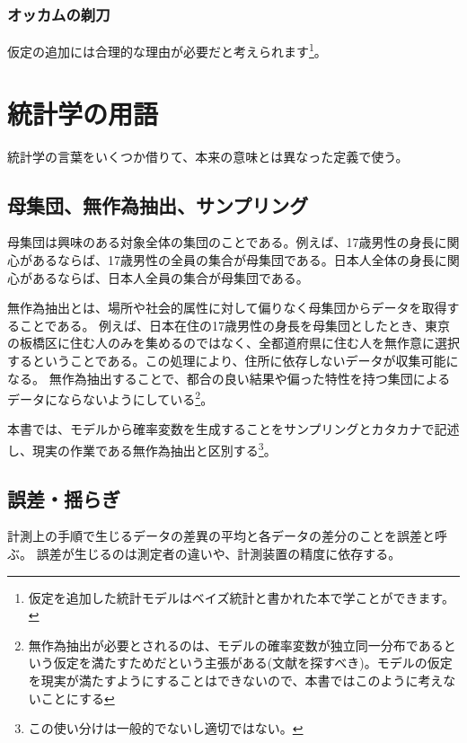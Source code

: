 \subsubsection{オッカムの剃刀}

仮定の追加には合理的な理由が必要だと考えられます\footnote{仮定を追加した統計モデルはベイズ統計と書かれた本で学ことができます。}。

\begin{figure}
    \begin{center}
%
\end{center}
\end{figure}
\fi


\section{統計学の用語}
統計学の言葉をいくつか借りて、本来の意味とは異なった定義で使う。


\subsection{母集団、無作為抽出、サンプリング}
母集団は興味のある対象全体の集団のことである。例えば、17歳男性の身長に関心があるならば、17歳男性の全員の集合が母集団である。日本人全体の身長に関心があるならば、日本人全員の集合が母集団である。

無作為抽出とは、場所や社会的属性に対して偏りなく母集団からデータを取得することである。
例えば、日本在住の17歳男性の身長を母集団としたとき、東京の板橋区に住む人のみを集めるのではなく、全都道府県に住む人を無作意に選択するということである。この処理により、住所に依存しないデータが収集可能になる。
無作為抽出することで、都合の良い結果や偏った特性を持つ集団によるデータにならないようにしている\footnote{無作為抽出が必要とされるのは、モデルの確率変数が独立同一分布であるという仮定を満たすためだという主張がある(文献を探すべき)。モデルの仮定を現実が満たすようにすることはできないので、本書ではこのように考えないことにする}。


本書では、モデルから確率変数を生成することをサンプリングとカタカナで記述し、現実の作業である無作為抽出と区別する\footnote{この使い分けは一般的でないし適切ではない。}。

\subsection{誤差・揺らぎ}
計測上の手順で生じるデータの差異の平均と各データの差分のことを誤差と呼ぶ。
誤差が生じるのは測定者の違いや、計測装置の精度に依存する。

